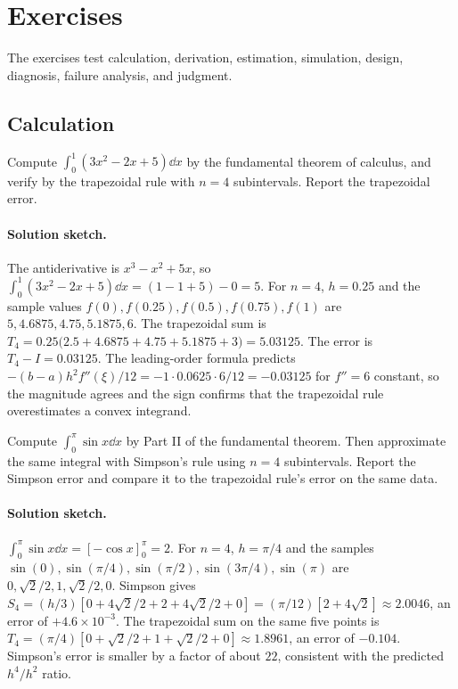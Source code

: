 \section{Exercises}

The exercises test calculation, derivation, estimation, simulation,
design, diagnosis, failure analysis, and judgment.

\subsection*{Calculation}

\begin{exercise}
Compute $\int_{0}^{1} (3 x^{2} - 2 x + 5) \dd x$ by the
fundamental theorem of calculus, and verify by the trapezoidal
rule with $n = 4$ subintervals. Report the trapezoidal error.
\end{exercise}

\paragraph{Solution sketch.}
The antiderivative is $x^{3} - x^{2} + 5x$, so
$\int_{0}^{1}(3x^{2} - 2x + 5)\dd x = (1 - 1 + 5) - 0 = 5$. For
$n = 4$, $h = 0.25$ and the sample values $f(0), f(0.25), f(0.5),
f(0.75), f(1)$ are $5, 4.6875, 4.75, 5.1875, 6$. The trapezoidal
sum is $T_{4} = 0.25\bigl(2.5 + 4.6875 + 4.75 + 5.1875 + 3\bigr) =
5.03125$. The error is $T_{4} - I = 0.03125$. The leading-order
formula predicts $-(b-a)h^{2}f''(\xi)/12 = -1 \cdot 0.0625 \cdot 6
/ 12 = -0.03125$ for $f'' = 6$ constant, so the magnitude agrees
and the sign confirms that the trapezoidal rule overestimates a
convex integrand.

\begin{exercise}
Compute $\int_{0}^{\pi} \sin x \dd x$ by Part II of the
fundamental theorem. Then approximate the same integral with
Simpson's rule using $n = 4$ subintervals. Report the Simpson
error and compare it to the trapezoidal rule's error on the same
data.
\end{exercise}

\paragraph{Solution sketch.}
$\int_{0}^{\pi}\sin x \dd x = [-\cos x]_{0}^{\pi} = 2$. For $n =
4$, $h = \pi/4$ and the samples $\sin(0), \sin(\pi/4), \sin(\pi/2),
\sin(3\pi/4), \sin(\pi)$ are $0, \sqrt{2}/2, 1, \sqrt{2}/2, 0$.
Simpson gives $S_{4} = (h/3)[0 + 4\sqrt{2}/2 + 2 + 4\sqrt{2}/2 +
0] = (\pi/12)[2 + 4\sqrt{2}] \approx 2.0046$, an error of
$+4.6\times 10^{-3}$. The trapezoidal sum on the same five points
is $T_{4} = (\pi/4)[0 + \sqrt{2}/2 + 1 + \sqrt{2}/2 + 0]
\approx 1.8961$, an error of $-0.104$. Simpson's error is smaller
by a factor of about $22$, consistent with the predicted $h^{4}/
h^{2}$ ratio.

